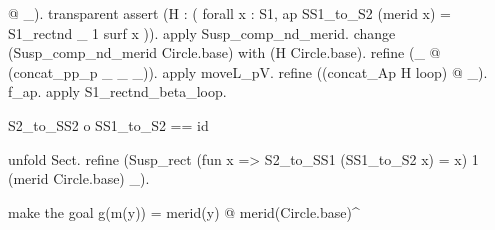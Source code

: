 \begin{coqdoccode}
\begin{coqdoccomment}
@\coqdocindent{0.50em}
\_).\coqdoceol
\coqdocindent{1.00em}
transparent\coqdocindent{0.50em}
assert\coqdocindent{0.50em}
(H\coqdocindent{0.50em}
:\coqdocindent{0.50em}
(\coqdoceol
\coqdocindent{2.00em}
forall\coqdocindent{0.50em}
x\coqdocindent{0.50em}
:\coqdocindent{0.50em}
S1,\coqdocindent{0.50em}
ap\coqdocindent{0.50em}
SS1\_to\_S2\coqdocindent{0.50em}
(merid\coqdocindent{0.50em}
x)\coqdocindent{0.50em}
=\coqdocindent{0.50em}
S1\_rectnd\coqdocindent{0.50em}
\_\coqdocindent{0.50em}
1\coqdocindent{0.50em}
surf\coqdocindent{0.50em}
x\coqdocindent{12.00em}
\coqdoceol
\coqdocindent{1.00em}
)).\coqdoceol
\coqdocindent{1.00em}
apply\coqdocindent{0.50em}
Susp\_comp\_nd\_merid.\coqdoceol
\coqdocindent{1.00em}
change\coqdocindent{0.50em}
(Susp\_comp\_nd\_merid\coqdocindent{0.50em}
Circle.base)\coqdocindent{0.50em}
with\coqdocindent{0.50em}
(H\coqdocindent{0.50em}
Circle.base).\coqdoceol
\coqdocindent{1.00em}
refine\coqdocindent{0.50em}
(\_\coqdocindent{0.50em}
@\coqdocindent{0.50em}
(concat\_pp\_p\coqdocindent{0.50em}
\_\coqdocindent{0.50em}
\_\coqdocindent{0.50em}
\_)).\coqdocindent{0.50em}
apply\coqdocindent{0.50em}
moveL\_pV.\coqdoceol
\coqdocindent{1.00em}
refine\coqdocindent{0.50em}
((concat\_Ap\coqdocindent{0.50em}
H\coqdocindent{0.50em}
loop)\coqdocindent{0.50em}
@\coqdocindent{0.50em}
\_).\coqdocindent{0.50em}
f\_ap.\coqdoceol
\coqdocindent{1.00em}
apply\coqdocindent{0.50em}
S1\_rectnd\_beta\_loop.\coqdoceol
\coqdocindent{1.00em}
\coqdoceol
\coqdoceol
\coqdocindent{1.00em}
\begin{coqdoccomment}
\coqdocindent{0.50em}
S2\_to\_SS2\coqdocindent{0.50em}
o\coqdocindent{0.50em}
SS1\_to\_S2\coqdocindent{0.50em}
==\coqdocindent{0.50em}
id\coqdocindent{0.50em}
\end{coqdoccomment}
\coqdoceol
\coqdocindent{1.00em}
unfold\coqdocindent{0.50em}
Sect.\coqdoceol
\coqdocindent{1.00em}
refine\coqdocindent{0.50em}
(Susp\_rect\coqdocindent{0.50em}
(fun\coqdocindent{0.50em}
x\coqdocindent{0.50em}
=>\coqdocindent{0.50em}
S2\_to\_SS1\coqdocindent{0.50em}
(SS1\_to\_S2\coqdocindent{0.50em}
x)\coqdocindent{0.50em}
=\coqdocindent{0.50em}
x)\coqdocindent{0.50em}
1\coqdocindent{0.50em}
(merid\coqdocindent{0.50em}
Circle.base)\coqdocindent{0.50em}
\_).\coqdoceol
\coqdoceol
\coqdocindent{1.00em}
\begin{coqdoccomment}
\coqdocindent{0.50em}
make\coqdocindent{0.50em}
the\coqdocindent{0.50em}
goal\coqdocindent{0.50em}
g(m(y))\coqdocindent{0.50em}
=\coqdocindent{0.50em}
merid(y)\coqdocindent{0.50em}
@\coqdocindent{0.50em}
merid(Circle.base)\^{}\coqdocindent{0.50em}
\end{coqdoccomment}

\end{coqdoccomment}
\end{coqdoccode}
